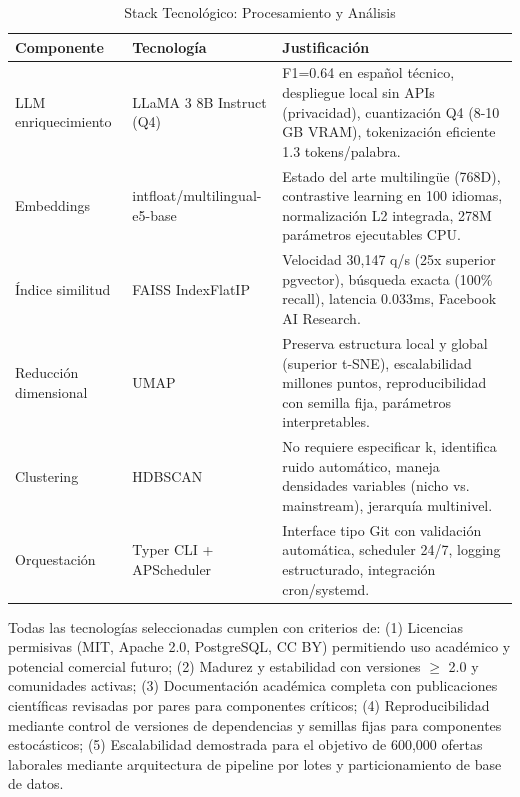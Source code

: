 \begin{table}[H]
\centering
\caption{Stack Tecnológico: Procesamiento y Análisis}
\label{tab:tech-stack-analytics}
\begin{tabular}{|p{3.5cm}|p{3.5cm}|p{6.5cm}|}
\hline
\textbf{Componente} & \textbf{Tecnología} & \textbf{Justificación} \\
\hline
LLM enriquecimiento & LLaMA 3 8B Instruct (Q4) & F1=0.64 en español técnico, despliegue local sin APIs (privacidad), cuantización Q4 (8-10 GB VRAM), tokenización eficiente 1.3 tokens/palabra. \\
\hline
Embeddings & intfloat/multilingual-e5-base & Estado del arte multilingüe (768D), contrastive learning en 100 idiomas, normalización L2 integrada, 278M parámetros ejecutables CPU. \\
\hline
Índice similitud & FAISS IndexFlatIP & Velocidad 30,147 q/s (25x superior pgvector), búsqueda exacta (100\% recall), latencia 0.033ms, Facebook AI Research. \\
\hline
Reducción dimensional & UMAP \cite{mcinnes2018umap} & Preserva estructura local y global (superior t-SNE), escalabilidad millones puntos, reproducibilidad con semilla fija, parámetros interpretables. \\
\hline
Clustering & HDBSCAN \cite{campello2013} & No requiere especificar k, identifica ruido automático, maneja densidades variables (nicho vs. mainstream), jerarquía multinivel. \\
\hline
Orquestación & Typer CLI + APScheduler & Interface tipo Git con validación automática, scheduler 24/7, logging estructurado, integración cron/systemd. \\
\hline
\end{tabular}
\end{table}

Todas las tecnologías seleccionadas cumplen con criterios de: (1) Licencias permisivas (MIT, Apache 2.0, PostgreSQL, CC BY) permitiendo uso académico y potencial comercial futuro; (2) Madurez y estabilidad con versiones $\geq$ 2.0 y comunidades activas; (3) Documentación académica completa con publicaciones científicas revisadas por pares para componentes críticos; (4) Reproducibilidad mediante control de versiones de dependencias y semillas fijas para componentes estocásticos; (5) Escalabilidad demostrada para el objetivo de 600,000 ofertas laborales mediante arquitectura de pipeline por lotes y particionamiento de base de datos.
